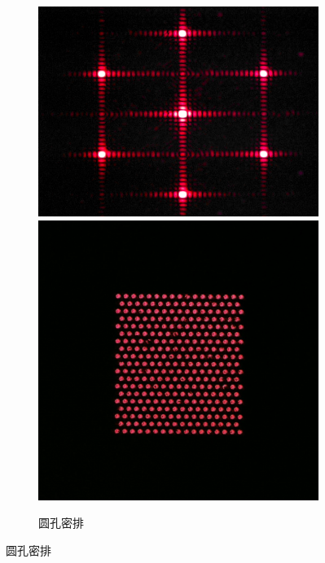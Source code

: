 \documentclass[a4paper]{article}
\begin{document}
\begin{figure}[htbp]
\begin{subfigure}[htbp]{0.3\textwidth}
        \label{1-7}
    \end{subfigure}
    \begin{subfigure}[htbp]{0.3\textwidth}
        \centering
        \includegraphics[width=\textwidth]{fre-done/1-8.JPG}
        \includegraphics[width=\textwidth]{img-done/1-8.JPG}
        \caption{圆孔密排}
        \label{1-8}
    \end{subfigure}

\end{figure}
\end{document}
